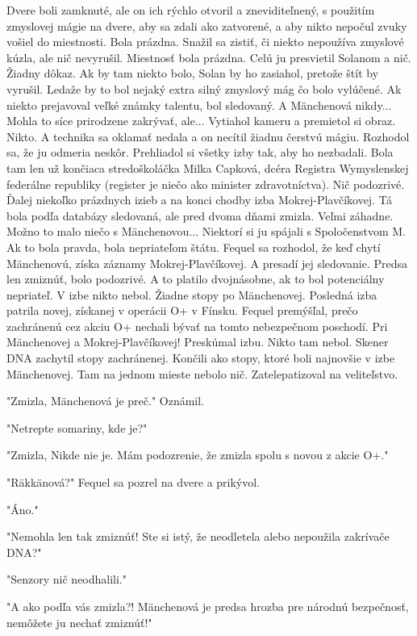 \documentclass{book}
\begin{document}
Dvere boli zamknuté, ale on ich rýchlo otvoril a zneviditeľnený, s použitím zmyslovej mágie na dvere, aby sa zdali ako zatvorené, a aby nikto nepočul zvuky vošiel do miestnosti. Bola prázdna. Snažil sa zistiť, či niekto nepoužíva zmyslové kúzla, ale nič nevyrušil. Miestnosť bola prázdna. Celú ju presvietil Solanom a nič. Žiadny dôkaz. Ak by tam niekto bolo, Solan by ho zasiahol, pretože štít by vyrušil. Ledaže by to bol nejaký extra silný zmyslový mág čo bolo vylúčené. Ak niekto prejavoval veľké známky talentu, bol sledovaný. A Mänchenová nikdy... Mohla to síce prirodzene zakrývať, ale... Vytiahol kameru a premietol si obraz. Nikto. A technika sa oklamať nedala a on necítil žiadnu čerstvú mágiu. Rozhodol sa, že ju odmeria neskôr. Prehliadol si všetky izby tak, aby ho nezbadali. Bola tam len už končiaca stredoškoláčka Milka Capková, dcéra Registra Wymyslenskej federálne republiky (register je niečo ako minister zdravotníctva). Nič podozrivé. Ďalej niekoľko prázdnych izieb a na konci chodby izba Mokrej-Plavčíkovej. Tá bola podľa databázy sledovaná, ale pred dvoma dňami zmizla. Veľmi záhadne. Možno to malo niečo s Mänchenovou... Niektorí si ju spájali s Spoločenstvom M. Ak to bola pravda, bola nepriateľom štátu. Fequel sa rozhodol, že keď chytí Mänchenovú, získa záznamy Mokrej-Plavčíkovej. A presadí jej sledovanie. Predsa len zmiznúť, bolo podozrivé. A to platilo dvojnásobne, ak to bol potenciálny nepriateľ. V izbe nikto nebol. Žiadne stopy po Mänchenovej. Posledná izba patrila novej, získanej v operácii O+ v Fínsku. Fequel premýšľal, prečo zachránenú cez akciu O+ nechali bývať na tomto nebezpečnom poschodí. Pri Mänchenovej a Mokrej-Plavčíkovej! Preskúmal izbu. Nikto tam nebol. Skener DNA zachytil stopy zachránenej. Končili ako stopy, ktoré boli najnovšie v izbe Mänchenovej. Tam na jednom mieste nebolo nič. Zatelepatizoval na veliteľstvo.

"$ $Zmizla, Mänchenová je preč."$ $  Oznámil.

"$ $Netrepte somariny, kde je?"$ $ 

"$ $Zmizla, Nikde nie je. Mám podozrenie, že zmizla spolu s novou z akcie O+."$ $ 

"$ $Räkkänová?"$ $  Fequel sa pozrel na dvere a prikývol.

"$ $Áno."$ $ 

"$ $Nemohla len tak zmiznúť! Ste si istý, že neodletela alebo nepoužila zakrívače DNA?"$ $ 

"$ $Senzory nič neodhalili."$ $ 

"$ $A ako podľa vás zmizla?! Mänchenová je predsa hrozba pre národnú bezpečnosť, nemôžete ju nechať zmiznúť!"$ $ 
\end{document}
